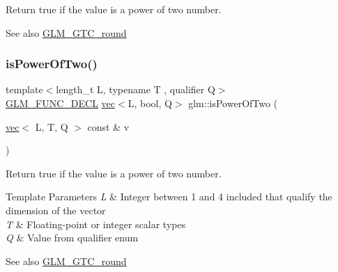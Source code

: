 Return true if the value is a power of two number.

\begin{DoxySeeAlso}{See also}
\hyperlink{group__gtc__round}{G\+L\+M\+\_\+\+G\+T\+C\+\_\+round} 
\end{DoxySeeAlso}
\mbox{\label{group__gtc__round_gabf2b61ded7049bcb13e25164f832a290}} 
\subsubsection{\texorpdfstring{is\+Power\+Of\+Two()}{isPowerOfTwo()}\hspace{0.1cm}{\footnotesize\ttfamily [2/2]}}
{\footnotesize\ttfamily template$<$length\+\_\+t L, typename T , qualifier Q$>$ \\
\hyperlink{setup_8hpp_ab2d052de21a70539923e9bcbf6e83a51}{G\+L\+M\+\_\+\+F\+U\+N\+C\+\_\+\+D\+E\+CL} \hyperlink{structglm_1_1vec}{vec}$<$L, bool, Q$>$ glm\+::is\+Power\+Of\+Two (\begin{DoxyParamCaption}\item[{\hyperlink{structglm_1_1vec}{vec}$<$ L, T, Q $>$ const \&}]{v }\end{DoxyParamCaption})}

Return true if the value is a power of two number.


\begin{DoxyTemplParams}{Template Parameters}
{\em L} & Integer between 1 and 4 included that qualify the dimension of the vector \\
\hline
{\em T} & Floating-\/point or integer scalar types \\
\hline
{\em Q} & Value from qualifier enum\\
\hline
\end{DoxyTemplParams}
\begin{DoxySeeAlso}{See also}
\hyperlink{group__gtc__round}{G\+L\+M\+\_\+\+G\+T\+C\+\_\+round} 
\end{DoxySeeAlso}
\mbox{\label{group__gtc__round_gab892defcc9c0b0618df7251253dc0fbb}} 
